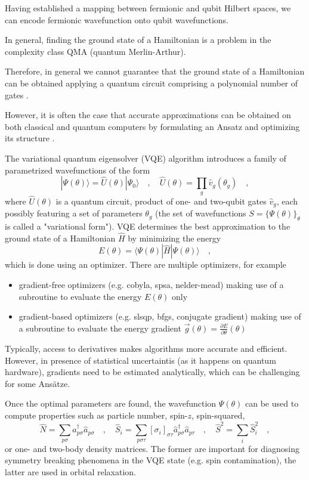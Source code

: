 \documentclass{article}
\newcommand{\CRE}[1]{\hat{a}^\dagger_{#1}}
\newcommand{\DIS}[1]{\hat{a}^{\phantom{\dagger}}_{#1}}
\begin{document}
Having established a mapping between fermionic and qubit Hilbert spaces, 
we can encode fermionic wavefunction onto qubit wavefunctions.

In general, finding the ground state of a Hamiltonian is a problem in the complexity class QMA (quantum Merlin-Arthur).

Therefore, in general we cannot guarantee that the ground state of a Hamiltonian can be obtained
applying a quantum circuit comprising a polynomial number of gates \cite{kempe2006complexity}.

However, it is often the case that accurate approximations can be obtained on both classical and quantum computers
by formulating an Ansatz and optimizing its structure \cite{peruzzo2014variational}.

The variational quantum eigensolver (VQE) algorithm introduces a family of parametrized wavefunctions of the form
\begin{equation}
| \Psi(\theta) \rangle = \hat{U}(\theta) | \Psi_0 \rangle
\quad,\quad
\hat{U}(\theta) = \prod_{g} \hat{v}_g(\theta_g)
\quad,
\end{equation}
where $\hat{U}(\theta)$ is a quantum circuit, product of one- and two-qubit gates $\hat{v}_g$, each possibly featuring a set 
of parameters $\theta_g$ (the set of wavefunctions $S = \{ \Psi(\theta) \}_\theta$ is called a "variational form").
VQE determines the best approximation to the ground state of a Hamiltonian $\hat{H}$ by minimizing the energy
\begin{equation}
E(\theta) = \langle \Psi(\theta) | \hat{H} | \Psi(\theta) \rangle
\quad,
\end{equation}
which is done using an optimizer. There are multiple optimizers, for example
\begin{itemize}
\item gradient-free optimizers (e.g. cobyla, spsa, nelder-mead) making use of a subroutine to evaluate the energy $E(\theta)$ only
\item gradient-based optimizers (e.g. slsqp, bfgs, conjugate gradient) making use of a subroutine to evaluate the energy gradient $
\vec{g}(\theta) = \frac{\partial E}{\partial \theta}(\theta)$
\end{itemize}
Typically, access to derivatives makes algorithms more accurate and efficient. However, in presence of statistical uncertaintis
(as it happens on quantum hardware), gradients need to be estimated analytically, which can be challenging for some Ans\"{a}tze.

Once the optimal parameters are found, the wavefunction $\Psi(\theta)$ can be used to compute properties such as 
particle number, spin-$z$, spin-squared, 
\begin{equation}
\hat{N} = \sum_{p \sigma} \CRE{p \sigma} \DIS{p \sigma}
\quad,\quad
\hat{S}_i = \sum_{p \sigma \tau} \left[ \sigma_{i} \right]_{\sigma\tau} \CRE{p \sigma} \DIS{p \tau}
\quad,\quad
\hat{S}^2 = \sum_i \hat{S}_i^2
\quad,
\end{equation}
or one- and two-body density matrices. The former are important for diagnosing symmetry breaking phenomena in the VQE state
(e.g. spin contamination), the latter are used in orbital relaxation.
\end{document}

